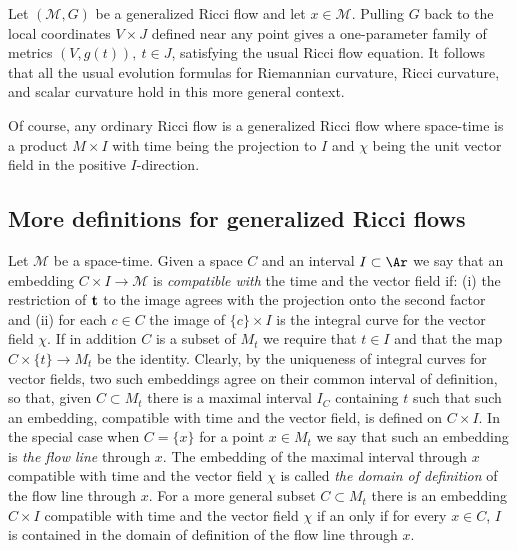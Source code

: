 \begin{remark}\label{rem:generalized-ricci-flow-local}
Let $({\mathcal M},G)$ be a generalized Ricci flow and let $x\in
{\mathcal M}$. Pulling $G$ back to  the local coordinates $V\times
J$ defined near any point gives a one-parameter family of metrics
$(V,g(t)),\  t\in J$, satisfying the usual Ricci flow equation. It
follows that all the usual evolution formulas for Riemannian
curvature, Ricci curvature, and scalar curvature hold in this more
general context.
\end{remark}

Of course, any ordinary Ricci flow is a generalized Ricci flow where
space-time is a product $M\times I$ with time being the projection
to $I$ and $\chi$ being the unit vector field in the positive
$I$-direction.


\subsection{More definitions for generalized Ricci flows}

\begin{definition}\label{def:compatible-embedding}
Let ${\mathcal M}$ be a space-time. Given a space $C$ and an
interval $I\subset \Ar$  we say that an embedding $C\times I\to
{\mathcal M}$ is {\em compatible with} the time and the vector field
if: (i) the restriction of ${\bf t}$ to the image agrees with the
projection onto the second factor and (ii) for each $c\in C$ the
image of $\{c\}\times I$ is the integral curve for the vector field
$\chi$.
 If in addition $C$ is a subset of $M_{t}$
we require that $t\in I$ and that the map $C\times\{t\}\to M_{t}$ be
the identity. Clearly, by the uniqueness of integral curves for vector fields,
 two such embeddings agree on their common interval of definition, so that,
given $C\subset M_{t}$ there is a maximal interval $I_C$ containing
$t$ such that such an embedding, compatible with time and the vector field,
 is defined on $C\times I$. In the
special case when $C=\{x\}$ for a point $x\in M_{t}$ we say that
such an embedding is {\em the flow line} through $x$. The embedding
of the maximal interval through $x$ compatible with time and the vector
field $\chi$ is called {\em the domain of definition} of the flow
line through $x$. For a more general subset $C\subset M_{t}$ there
is an embedding $C\times I$ compatible with time and the vector
field $\chi$ if an only if for every $x\in C$, $I$ is contained in
the domain of definition of the flow line through $x$.
\end{definition}


